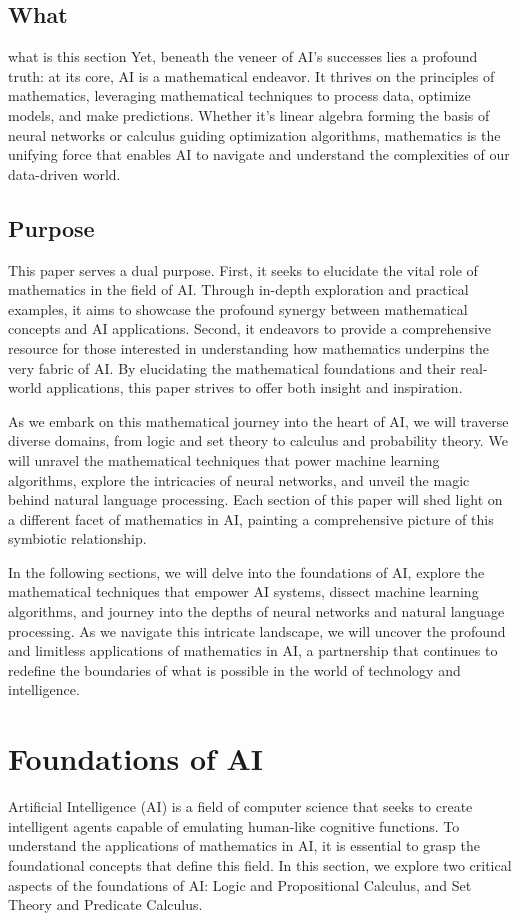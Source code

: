 \documentclass[conference]{IEEEtran}
\begin{document}
	\subsection{What}
	what is this section
Yet, beneath the veneer of AI's successes lies a profound truth: at its core, AI is a mathematical endeavor. It thrives on the principles of mathematics, leveraging mathematical techniques to process data, optimize models, and make predictions. Whether it's linear algebra forming the basis of neural networks or calculus guiding optimization algorithms, mathematics is the unifying force that enables AI to navigate and understand the complexities of our data-driven world.

    \subsection{Purpose}
    This paper serves a dual purpose. First, it seeks to elucidate the vital role of mathematics in the field of AI. Through in-depth exploration and practical examples, it aims to showcase the profound synergy between mathematical concepts and AI applications. Second, it endeavors to provide a comprehensive resource for those interested in understanding how mathematics underpins the very fabric of AI. By elucidating the mathematical foundations and their real-world applications, this paper strives to offer both insight and inspiration.

As we embark on this mathematical journey into the heart of AI, we will traverse diverse domains, from logic and set theory to calculus and probability theory. We will unravel the mathematical techniques that power machine learning algorithms, explore the intricacies of neural networks, and unveil the magic behind natural language processing. Each section of this paper will shed light on a different facet of mathematics in AI, painting a comprehensive picture of this symbiotic relationship.

In the following sections, we will delve into the foundations of AI, explore the mathematical techniques that empower AI systems, dissect machine learning algorithms, and journey into the depths of neural networks and natural language processing. As we navigate this intricate landscape, we will uncover the profound and limitless applications of mathematics in AI, a partnership that continues to redefine the boundaries of what is possible in the world of technology and intelligence.

    
    \section{Foundations of AI}
    Artificial Intelligence (AI) is a field of computer science that seeks to create intelligent agents capable of emulating human-like cognitive functions. To understand the applications of mathematics in AI, it is essential to grasp the foundational concepts that define this field. In this section, we explore two critical aspects of the foundations of AI: Logic and Propositional Calculus, and Set Theory and Predicate Calculus.
\end{document}
